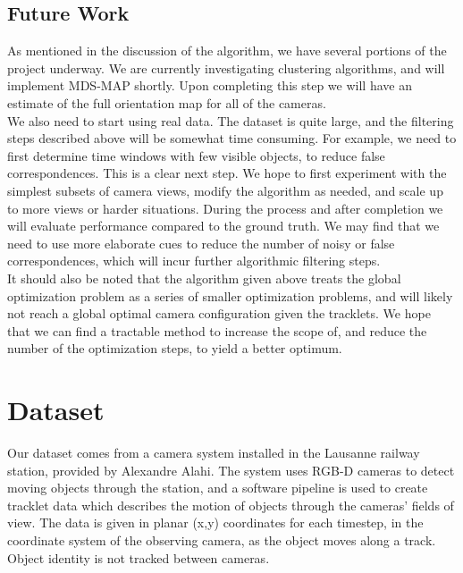 \documentclass[journal]{IEEEtran}
\begin{document}
	\subsection{Future Work}
		\indent 	As mentioned in the discussion of the algorithm, we have several portions of the project underway. We are currently investigating clustering algorithms, and will implement MDS-MAP shortly. Upon completing this step we will have an estimate of the full orientation map for all of the cameras. \\
		\indent We also need to start using real data. The dataset is quite large, and the filtering steps described above will be somewhat time consuming. For example, we need to first determine time windows with few visible objects, to reduce false correspondences. This is a clear next step. We hope to first experiment with the simplest subsets of camera views, modify the algorithm as needed, and scale up to more views or harder situations. During the process and after completion we will evaluate performance compared to the ground truth. We may find that we need to use more elaborate cues to reduce the number of noisy or false correspondences, which will incur further algorithmic filtering steps. \\
		\indent It should also be noted that the algorithm given above treats the global optimization problem as a series of smaller optimization problems, and will likely not reach a global optimal camera configuration given the tracklets. We hope that we can find a tractable method to increase the scope of, and reduce the number of the optimization steps, to yield a better optimum.
	
\section{Dataset}
	\indent Our dataset comes from a camera system installed in the Lausanne railway station, provided by Alexandre Alahi. The system uses RGB-D cameras to detect moving objects through the station, and a software pipeline is used to create tracklet data which describes the motion of objects through the cameras’ fields of view. The data is given in planar (x,y) coordinates for each timestep, in the coordinate system of the observing camera, as the object moves along a track. Object identity is not tracked between cameras.

\end{document}
